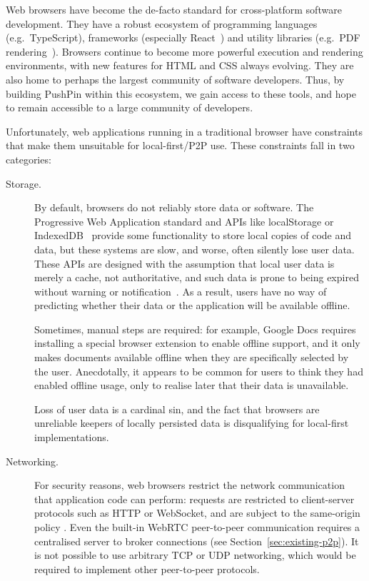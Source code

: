\documentclass[sigplan,10pt]{acmart}
\begin{document}
Web browsers have become the de-facto standard for cross-platform software development. They have a robust ecosystem of programming languages (e.g.\ TypeScript), frameworks (especially React~\cite{React}) and utility libraries (e.g.\ PDF rendering~\cite{PDFjs}). Browsers continue to become more powerful execution and rendering environments, with new features for HTML and CSS always evolving. They are also home to perhaps the largest community of software developers. Thus, by building PushPin within this ecosystem, we gain access to these tools, and hope to remain accessible to a large community of developers.

Unfortunately, web applications running in a traditional browser have constraints that make them unsuitable for local-first/P2P use. These constraints fall in two categories:

\begin{description}

\item[Storage.]
By default, browsers do not reliably store data or software. The Progressive Web Application standard \cite{PWA} and APIs like localStorage or IndexedDB~\cite{IndexedDB} provide some functionality to store local copies of code and data, but these systems are slow, and worse, often silently lose user data. These APIs are designed with the assumption that local user data is merely a cache, not authoritative, and such data is prone to being expired without warning or notification~\cite{LocalStorageCleared,Wilander:2020}.
As a result, users have no way of predicting whether their data or the application will be available offline.

Sometimes, manual steps are required: for example, Google Docs requires installing a special browser extension to enable offline support, and it only makes documents available offline when they are specifically selected by the user. Anecdotally, it appears to be common for users to think they had enabled offline usage, only to realise later that their data is unavailable.

Loss of user data is a cardinal sin, and the fact that browsers are unreliable keepers of locally persisted data is disqualifying for local-first implementations.

\item[Networking.]
For security reasons, web browsers restrict the network communication that application code can perform: requests are restricted to client-server protocols such as HTTP or WebSocket, and are subject to the same-origin policy \cite{SameOrigin}. Even the built-in WebRTC peer-to-peer communication requires a centralised server to broker connections (see Section~\ref{sec:existing-p2p}). It is not possible to use arbitrary TCP or UDP networking, which would be required to implement other peer-to-peer protocols.
\end{description}
\end{document}
